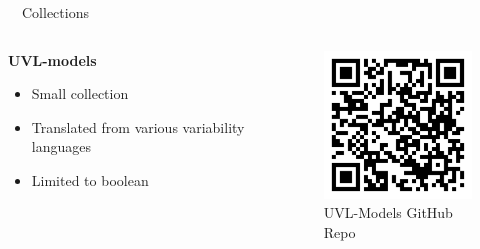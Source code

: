 \documentclass[
	aspectratio=169, %
	8pt, %
	nosectionframes, %
]{beamer}
\newcommand{\inlinesubtitle}[1]{\textcolor{gray!60}{~{}~#1}}
\begin{document}
\begin{frame}{\insertsection \inlinesubtitle{Collections}}
    \vspace{0.4cm}
    \begin{columns}[t]
		\begin{column}{0.49\textwidth}
			\textbf{UVL-models}
            \begin{itemize}
                \item Small collection
                \item Translated from various variability languages
                \item Limited to boolean
            \end{itemize}
		\end{column}%
		\begin{column}{0.49\textwidth}
           \begin{figure}
                \centering
                \includegraphics[width=5cm]{pics/qr/collection.pdf}
                \caption{UVL-Models GitHub Repo}
            \end{figure}
		\end{column}
	\end{columns}
\end{frame}
\end{document}
